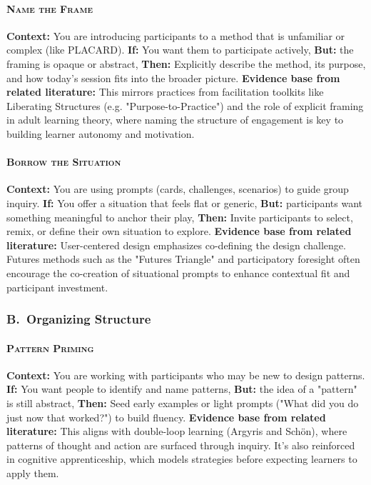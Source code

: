 \documentclass[acmlarge,timestamp]{acmart}
\begin{document}
{\paragraph*{{\scshape Name the Frame}}

\noindent\textbf{Context:} You are introducing participants to a method that is unfamiliar or complex (like PLACARD).
\textbf{If:} You want them to participate actively,  \textbf{But:} the framing is opaque or abstract,
\textbf{Then:} Explicitly describe the method, its purpose, and how today’s session fits into the broader picture.
\textbf{Evidence base from related literature:} This mirrors practices from facilitation toolkits like Liberating Structures (e.g. "Purpose-to-Practice") and the role of explicit framing in adult learning theory, where naming the structure of engagement is key to building learner autonomy and motivation.

\paragraph*{{\scshape Borrow the Situation}}

\noindent \textbf{Context:} You are using prompts (cards, challenges, scenarios) to guide group inquiry.
\textbf{If:} You offer a situation that feels flat or generic,  \textbf{But:} participants want something meaningful to anchor their play,
\textbf{Then:} Invite participants to select, remix, or define their own situation to explore.
\textbf{Evidence base from related literature:} User-centered design emphasizes co-defining the design challenge. Futures methods such as the "Futures Triangle" and participatory foresight often encourage the co-creation of situational prompts to enhance contextual fit and participant investment.

\subsubsection*{B.~Organizing Structure}

\paragraph*{{\scshape Pattern Priming}}

\noindent \textbf{Context:} You are working with participants who may be new to design patterns.
\textbf{If:} You want people to identify and name patterns,  \textbf{But:} the idea of a "pattern" is still abstract,
\textbf{Then:} Seed early examples or light prompts ("What did you do just now that worked?") to build fluency.
\textbf{Evidence base from related literature:} This aligns with double-loop learning (Argyris and Schön), where patterns of thought and action are surfaced through inquiry. It's also reinforced in cognitive apprenticeship, which models strategies before expecting learners to apply them.

}
\end{document}
